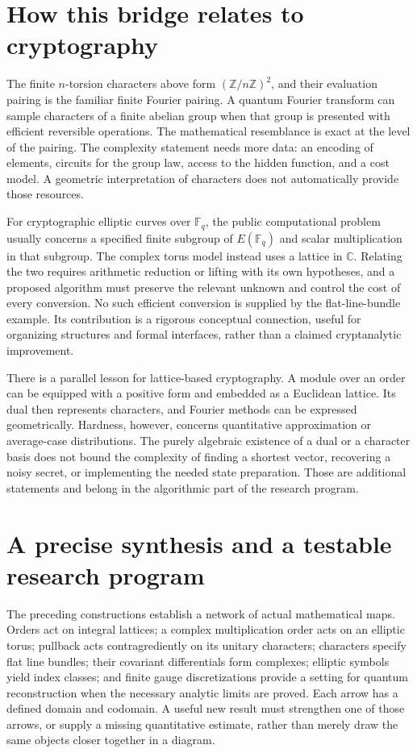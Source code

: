 \section{How this bridge relates to cryptography}

The finite $n$-torsion characters above form
$(\mathbb Z/n\mathbb Z)^2$, and their evaluation pairing is the
familiar finite Fourier pairing.  A quantum Fourier transform can sample
characters of a finite abelian group when that group is presented with
efficient reversible operations.  The mathematical resemblance is exact
at the level of the pairing.  The complexity statement needs more data:
an encoding of elements, circuits for the group law, access to the hidden
function, and a cost model.  A geometric interpretation of characters
does not automatically provide those resources.

For cryptographic elliptic curves over $\mathbb F_q$, the public
computational problem usually concerns a specified finite subgroup of
$E(\mathbb F_q)$ and scalar multiplication in that subgroup.  The
complex torus model instead uses a lattice in $\mathbb C$.  Relating the
two requires arithmetic reduction or lifting with its own hypotheses,
and a proposed algorithm must preserve the relevant unknown and control
the cost of every conversion.  No such efficient conversion is supplied
by the flat-line-bundle example.  Its contribution is a rigorous
conceptual connection, useful for organizing structures and formal
interfaces, rather than a claimed cryptanalytic improvement.

There is a parallel lesson for lattice-based cryptography.  A module over
an order can be equipped with a positive form and embedded as a Euclidean
lattice.  Its dual then represents characters, and Fourier methods can
be expressed geometrically.  Hardness, however, concerns quantitative
approximation or average-case distributions.  The purely algebraic
existence of a dual or a character basis does not bound the complexity of
finding a shortest vector, recovering a noisy secret, or implementing the
needed state preparation.  Those are additional statements and belong
in the algorithmic part of the research program.

\section{A precise synthesis and a testable research program}

The preceding constructions establish a network of actual mathematical
maps.  Orders act on integral lattices; a complex multiplication order acts
on an elliptic torus; pullback acts contragrediently on its unitary
characters; characters specify flat line bundles; their covariant
differentials form complexes; elliptic symbols yield index classes; and
finite gauge discretizations provide a setting for quantum reconstruction
when the necessary analytic limits are proved.  Each arrow has a defined
domain and codomain.  A useful new result must strengthen one of those
arrows, or supply a missing quantitative estimate, rather than merely
draw the same objects closer together in a diagram.

